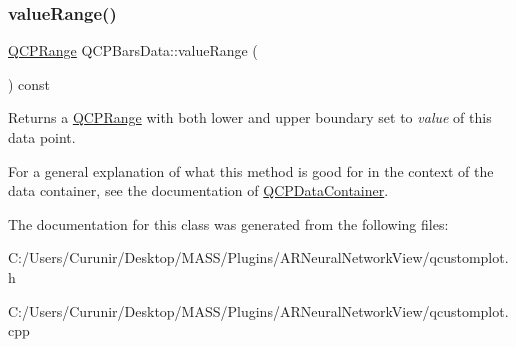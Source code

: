 \subsubsection{\texorpdfstring{value\+Range()}{valueRange()}}
{\footnotesize\ttfamily \hyperlink{class_q_c_p_range}{Q\+C\+P\+Range} Q\+C\+P\+Bars\+Data\+::value\+Range (\begin{DoxyParamCaption}{ }\end{DoxyParamCaption}) const\hspace{0.3cm}{\ttfamily [inline]}}

Returns a \hyperlink{class_q_c_p_range}{Q\+C\+P\+Range} with both lower and upper boundary set to {\itshape value} of this data point.

For a general explanation of what this method is good for in the context of the data container, see the documentation of \hyperlink{class_q_c_p_data_container}{Q\+C\+P\+Data\+Container}. 

The documentation for this class was generated from the following files\+:\begin{DoxyCompactItemize}
\item 
C\+:/\+Users/\+Curunir/\+Desktop/\+M\+A\+S\+S/\+Plugins/\+A\+R\+Neural\+Network\+View/qcustomplot.\+h\item 
C\+:/\+Users/\+Curunir/\+Desktop/\+M\+A\+S\+S/\+Plugins/\+A\+R\+Neural\+Network\+View/qcustomplot.\+cpp\end{DoxyCompactItemize}
